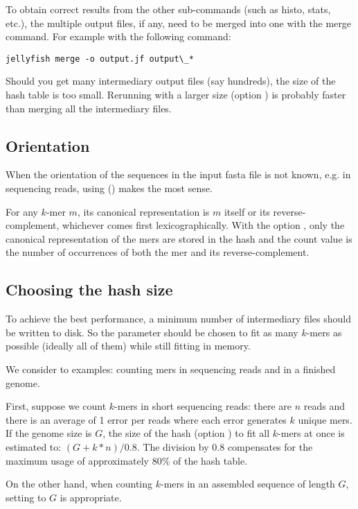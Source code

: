 \documentclass[english]{article}
\newcommand{\ddash}[1]{-\,-#1}
\newcommand{\LOpt}[1]{\Opt{\ddash{#1}}}
\begin{document}
To obtain correct results from the other sub-commands (such as histo,
stats, etc.), the multiple output files, if any, need to be merged into one
with the merge command. For example with the following command:

\begin{verbatim}
jellyfish merge -o output.jf output\_*
\end{verbatim}

Should you get many intermediary output files (say hundreds), the size
of the hash table is too small. Rerunning  with a
larger size (option ) is probably faster than merging all the
intermediary files.

\subsection{Orientation}
When the orientation of the sequences in the input fasta file is not
known, e.g. in sequencing reads, using \LOpt{both-strands} ()
makes the most sense.

For any $k$-mer $m$, its canonical representation is $m$ itself or its
reverse-complement, whichever comes first lexicographically. With the
option , only the canonical representation of the mers are
stored in the hash and the count value is the number of occurrences of
both the mer and its reverse-complement.


\subsection{Choosing the hash size}

To achieve the best performance, a minimum number of intermediary
files should be written to disk. So the parameter  should be
chosen to fit as many $k$-mers as possible (ideally all of them) while
still fitting in memory.

We consider to examples: counting mers in sequencing reads and in a
finished genome.

First, suppose we count $k$-mers in short sequencing reads:
there are $n$ reads and there is an average of 1 error per reads where
each error generates $k$ unique mers. If the genome size is $G$, the
size of the hash (option ) to fit all $k$-mers at once is estimated to: $(G +
k*n)/0.8$. The division by $0.8$ compensates for the maximum usage of
approximately $80\%$ of the hash table.

On the other hand, when counting $k$-mers in an assembled sequence of
length $G$, setting  to $G$ is appropriate.
\end{document}
